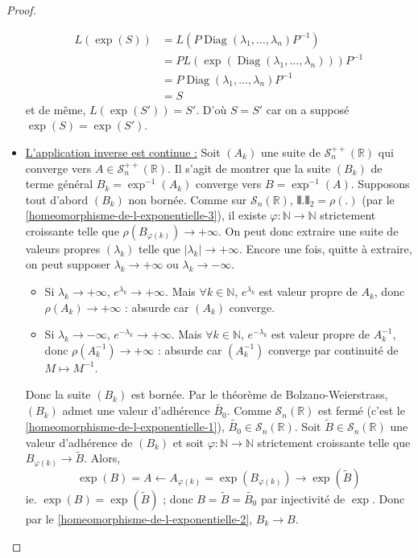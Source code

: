 \begin{proof}
\begin{itemize}
      \begin{align*}
        L(\exp(S)) &= L(P \operatorname{Diag}(\lambda_1, \dots, \lambda_n) P^{-1}) \\
        &= P L(\exp(\operatorname{Diag}(\lambda_1, \dots, \lambda_n))) P^{-1} \\
        &= P \operatorname{Diag}(\lambda_1, \dots, \lambda_n) P^{-1} \\
        &= S
      \end{align*}
      et de même, $L(\exp(S')) = S'$. D'où $S = S'$ car on a supposé $\exp(S) = \exp(S')$.
      \item \uline{L'application inverse est continue :} Soit $(A_k)$ une suite de $\mathcal{S}^{++}_n(\mathbb{R})$ qui converge vers $A \in \mathcal{S}^{++}_n(\mathbb{R})$. Il s'agit de montrer que la suite $(B_k)$ de terme général $B_k = \exp^{-1}(A_k)$ converge vers $B = \exp^{-1}(A)$. Supposons tout d'abord $(B_k)$ non bornée. Comme sur $\mathcal{S}_n(\mathbb{R})$, $\VERT . \VERT_2 = \rho(.)$ (par le \cref{homeomorphisme-de-l-exponentielle-3}), il existe $\varphi : \mathbb{N} \rightarrow \mathbb{N}$ strictement croissante telle que $\rho(B_{\varphi(k)}) \longrightarrow +\infty$. On peut donc extraire une suite de valeurs propres $(\lambda_k)$ telle que $|\lambda_k| \longrightarrow +\infty$. Encore une fois, quitte à extraire, on peut supposer $\lambda_k \longrightarrow +\infty$ ou $\lambda_k \longrightarrow -\infty$.
      \begin{itemize}
        \item Si $\lambda_k \longrightarrow +\infty$, $e^{\lambda_k} \longrightarrow +\infty$. Mais $\forall k \in \mathbb{N}$, $e^{\lambda_k}$ est valeur propre de $A_k$, donc $\rho(A_k) \longrightarrow +\infty$ : absurde car $(A_k)$ converge.
        \item Si $\lambda_k \longrightarrow -\infty$, $e^{-\lambda_k} \longrightarrow +\infty$. Mais $\forall k \in \mathbb{N}$, $e^{-\lambda_k}$ est valeur propre de $A_k^{-1}$, donc $\rho(A_k^{-1}) \longrightarrow +\infty$ : absurde car $(A_k^{-1})$ converge par continuité de $M \mapsto M^{-1}$.
      \end{itemize}
      Donc la suite $(B_k)$ est bornée. Par le théorème de Bolzano-Weierstrass, $(B_k)$ admet une valeur d'adhérence $\widetilde{B_0}$. Comme $\mathcal{S}_n(\mathbb{R})$ est fermé (c'est le \cref{homeomorphisme-de-l-exponentielle-1}), $\widetilde{B_0} \in \mathcal{S}_n(\mathbb{R})$.
      \newpar
      Soit $\widetilde{B} \in \mathcal{S}_n(\mathbb{R})$ une valeur d'adhérence de $(B_k)$ et soit $\varphi : \mathbb{N} \rightarrow \mathbb{N}$ strictement croissante telle que $B_{\varphi(k)} \longrightarrow \widetilde{B}$. Alors,
      \[ \exp(B) = A \longleftarrow A_{\varphi(k)} = \exp(B_{\varphi(k)}) \longrightarrow \exp(\widetilde{B}) \]
      ie. $\exp(B) = \exp(\widetilde{B})$ ; donc $B = \widetilde{B} = \widetilde{B_0}$ par injectivité de $\exp$. Donc par le \cref{homeomorphisme-de-l-exponentielle-2}, $B_k \longrightarrow B$.
    \end{itemize}
  \end{proof}

